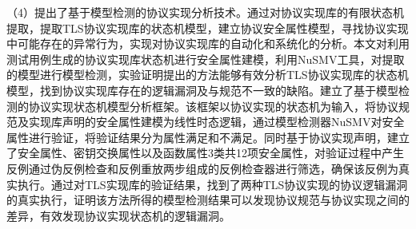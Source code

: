 \begin{cabstract}
（4）提出了基于模型检测的协议实现分析技术。通过对协议实现库的有限状态机提取，提取TLS协议实现库的状态机模型，建立协议安全属性模型，寻找协议实现中可能存在的异常行为，实现对协议实现库的自动化和系统化的分析。本文对利用测试用例生成的协议实现库状态机进行安全属性建模，利用NuSMV工具，对提取的模型进行模型检测，实验证明提出的方法能够有效分析TLS协议实现库的状态机模型，找到协议实现库存在的逻辑漏洞及与规范不一致的缺陷。建立了基于模型检测的协议实现状态机模型分析框架。该框架以协议实现的状态机为输入，将协议规范及实现库声明的安全属性建模为线性时态逻辑，通过模型检测器NuSMV对安全属性进行验证，将验证结果分为属性满足和不满足。同时基于协议实现声明，建立了安全属性、密钥交换属性以及函数属性3类共12项安全属性，对验证过程中产生反例通过伪反例检查和反例重放两步组成的反例检查器进行筛选，确保该反例为真实执行。通过对TLS实现库的验证结果，找到了两种TLS协议实现的协议逻辑漏洞的真实执行，证明该方法所得的模型检测结果可以发现协议规范与协议实现之间的差异，有效发现协议实现状态机的逻辑漏洞。


\end{cabstract}

